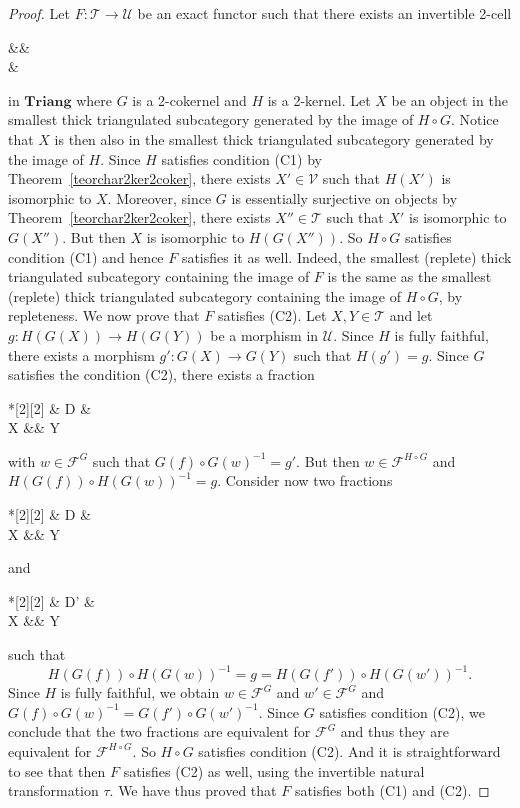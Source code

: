 \documentclass[11pt,reqno,a4paper]{amsart}
\theoremstyle{definition}
\theoremstyle{remark}
\def\nameit#1{\textrm{#1}~}
\def\thex{\nameit{Theorem}}
\newcommand{\T}{\mathcal{T}}
\newcommand{\U}{\mathcal{U}}
\newcommand{\V}{\mathcal{V}}
\newcommand{\F}{\mathcal{F}}
\newcommand{\0}{\mathbf{0}}
\renewcommand{\1}{\mathbf{1}}
\newcommand{\Triang}{\mathbf{Triang}}
\def\:{\colon}
\def\c{\circ}
\begin{document}
\begin{proof}
    Let $F\: \T \to \U$ be an exact functor such that there exists an invertible 2-cell
    \begin{cd}[4]
        \T \&\& \U \\
	\& \V
	\arrow["F", from=1-1, to=1-3]
	\arrow[""{name=0, anchor=center, inner sep=0}, "G"', from=1-1, to=2-2]
	\arrow[""{name=1, anchor=center, inner sep=0}, "H"', from=2-2, to=1-3]
	\arrow["\tau"'{inner sep=1ex},iso, shift left=2ex,from=0, to=1]
    \end{cd}
    in $\Triang$ where $G$ is a 2-cokernel and $H$ is a 2-kernel. Let $X$ be an object in the smallest thick triangulated subcategory generated by the image of $H\c G$. Notice that $X$ is then also in the smallest thick triangulated subcategory generated by the image of $H$. Since $H$ satisfies condition (C1) by \thex \ref{teorchar2ker2coker}, there exists $X'\in \V$ such that $H(X')$ is isomorphic to $X$. Moreover, since $G$ is essentially surjective on objects by \thex \ref{teorchar2ker2coker}, there exists $X''\in \T$ such that $X'$ is isomorphic to $G(X'')$. But then $X$ is isomorphic to $H(G(X''))$. So $H \c G$ satisfies condition (C1) and hence $F$ satisfies it as well. Indeed, the smallest (replete) thick triangulated subcategory containing the image of $F$ is the same as the smallest (replete) thick triangulated subcategory containing the image of $H\c G$, by repleteness. We now prove that $F$ satisfies (C2). Let $X,Y\in \T$ and let $g\: H(G(X)) \to H(G(Y))$ be a morphism in $\U$. Since $H$ is fully faithful, there exists a morphism $g'\: G(X) \to G(Y)$ such that $H(g')=g$. Since $G$ satisfies the condition (C2), there exists a fraction
\begin{cd}*[2][2] \& D \& \\[-2ex]
	X \&\& Y
	\arrow["w"', from=1-2, to=2-1]
	\arrow["f", from=1-2, to=2-3]\end{cd}
    with $w\in \F^{G}$ such that $G(f) \c G(w)^{-1}=g'$. But then $w\in \F^{H\c G}$ and $H(G(f)) \c H(G(w))^{-1}=g$. Consider now two fractions \begin{cd}*[2][2] \& D \& \\[-2ex]
	X \&\& Y
	\arrow["w"', from=1-2, to=2-1]
	\arrow["f", from=1-2, to=2-3]\end{cd} and \begin{cd}*[2][2] \& D' \& \\[-2ex]
	X \&\& Y
	\arrow["w'"', from=1-2, to=2-1]
	\arrow["f'", from=1-2, to=2-3]\end{cd}
    such that
    $$H(G(f)) \c H(G(w))^{-1}=g= H(G(f')) \c H(G(w'))^{-1}.$$
    Since $H$ is fully faithful, we obtain $w\in \F^{G}$ and $w'\in \F^{G}$ and $G(f) \c G(w)^{-1}=G(f') \c G(w')^{-1}$. Since $G$ satisfies condition (C2), we conclude that the two fractions are equivalent for $\F^G$ and thus they are equivalent for $\F^{H \c G}$. So $H\c G$ satisfies condition (C2). And it is straightforward to see that then $F$ satisfies (C2) as well, using the invertible natural transformation $\tau$. We have thus proved that $F$ satisfies both (C1) and (C2).


\end{proof}
\end{document}
